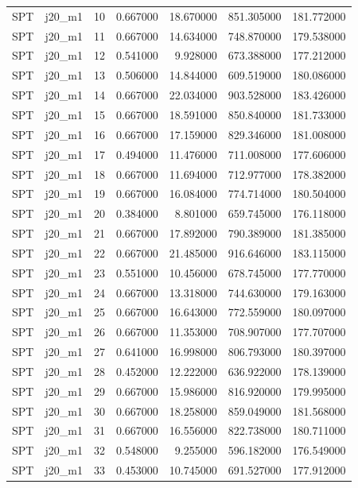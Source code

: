 \begin{tabular}{llrrrrr}
SPT & j20_m1 & 10 & 0.667000 & 18.670000 & 851.305000 & 181.772000 \\
SPT & j20_m1 & 11 & 0.667000 & 14.634000 & 748.870000 & 179.538000 \\
SPT & j20_m1 & 12 & 0.541000 & 9.928000 & 673.388000 & 177.212000 \\
SPT & j20_m1 & 13 & 0.506000 & 14.844000 & 609.519000 & 180.086000 \\
SPT & j20_m1 & 14 & 0.667000 & 22.034000 & 903.528000 & 183.426000 \\
SPT & j20_m1 & 15 & 0.667000 & 18.591000 & 850.840000 & 181.733000 \\
SPT & j20_m1 & 16 & 0.667000 & 17.159000 & 829.346000 & 181.008000 \\
SPT & j20_m1 & 17 & 0.494000 & 11.476000 & 711.008000 & 177.606000 \\
SPT & j20_m1 & 18 & 0.667000 & 11.694000 & 712.977000 & 178.382000 \\
SPT & j20_m1 & 19 & 0.667000 & 16.084000 & 774.714000 & 180.504000 \\
SPT & j20_m1 & 20 & 0.384000 & 8.801000 & 659.745000 & 176.118000 \\
SPT & j20_m1 & 21 & 0.667000 & 17.892000 & 790.389000 & 181.385000 \\
SPT & j20_m1 & 22 & 0.667000 & 21.485000 & 916.646000 & 183.115000 \\
SPT & j20_m1 & 23 & 0.551000 & 10.456000 & 678.745000 & 177.770000 \\
SPT & j20_m1 & 24 & 0.667000 & 13.318000 & 744.630000 & 179.163000 \\
SPT & j20_m1 & 25 & 0.667000 & 16.643000 & 772.559000 & 180.097000 \\
SPT & j20_m1 & 26 & 0.667000 & 11.353000 & 708.907000 & 177.707000 \\
SPT & j20_m1 & 27 & 0.641000 & 16.998000 & 806.793000 & 180.397000 \\
SPT & j20_m1 & 28 & 0.452000 & 12.222000 & 636.922000 & 178.139000 \\
SPT & j20_m1 & 29 & 0.667000 & 15.986000 & 816.920000 & 179.995000 \\
SPT & j20_m1 & 30 & 0.667000 & 18.258000 & 859.049000 & 181.568000 \\
SPT & j20_m1 & 31 & 0.667000 & 16.556000 & 822.738000 & 180.711000 \\
SPT & j20_m1 & 32 & 0.548000 & 9.255000 & 596.182000 & 176.549000 \\
SPT & j20_m1 & 33 & 0.453000 & 10.745000 & 691.527000 & 177.912000 \\

\end{tabular}
